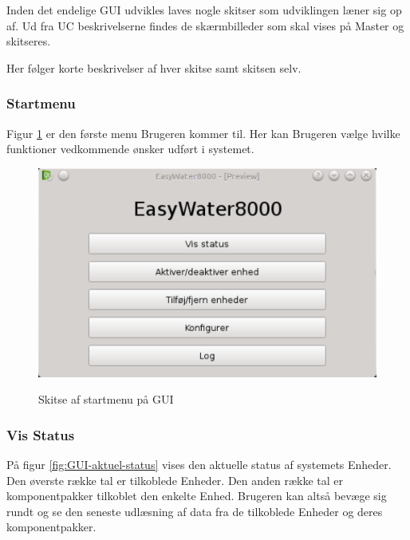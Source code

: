 
Inden det endelige GUI udvikles laves nogle skitser som udviklingen læner sig op af. Ud fra UC beskrivelserne findes de skærmbilleder som skal vises på Master og skitseres.

Her følger korte beskrivelser af hver skitse samt skitsen selv.

\subsubsection{Startmenu}
Figur \ref{fig:GUI-Startmenu} er den første menu Brugeren kommer til. Her kan Brugeren vælge hvilke funktioner vedkommende ønsker udført i systemet.

\begin{figure}[htbp] \centering
{\includegraphics[scale=0.5]{filer/pics/GUI/Start-menu}}
\caption{Skitse af startmenu på GUI}
\label{fig:GUI-Startmenu}
\end{figure}

\subsubsection{Vis Status}
På figur \ref{fig:GUI-aktuel-status} vises den aktuelle status af systemets Enheder. Den øverste række tal er tilkoblede Enheder. Den anden række tal er komponentpakker tilkoblet den enkelte Enhed. Brugeren kan altså bevæge sig rundt og se den seneste udlæsning af data fra de tilkoblede Enheder og deres komponentpakker.

